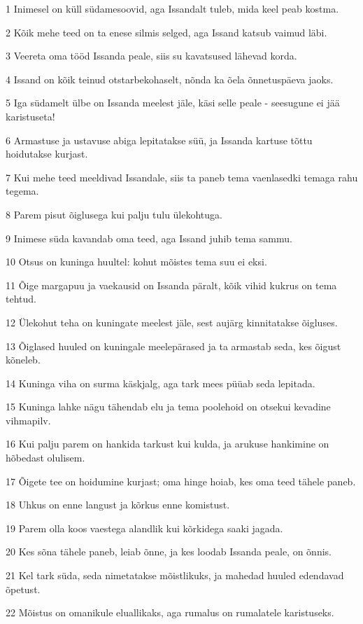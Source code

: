 \par 1 Inimesel on küll südamesoovid, aga Issandalt tuleb, mida keel peab kostma.
\par 2 Kõik mehe teed on ta enese silmis selged, aga Issand katsub vaimud läbi.
\par 3 Veereta oma tööd Issanda peale, siis su kavatsused lähevad korda.
\par 4 Issand on kõik teinud otstarbekohaselt, nõnda ka õela õnnetuspäeva jaoks.
\par 5 Iga südamelt ülbe on Issanda meelest jäle, käsi selle peale - seesugune ei jää karistuseta!
\par 6 Armastuse ja ustavuse abiga lepitatakse süü, ja Issanda kartuse tõttu hoidutakse kurjast.
\par 7 Kui mehe teed meeldivad Issandale, siis ta paneb tema vaenlasedki temaga rahu tegema.
\par 8 Parem pisut õiglusega kui palju tulu ülekohtuga.
\par 9 Inimese süda kavandab oma teed, aga Issand juhib tema sammu.
\par 10 Otsus on kuninga huultel: kohut mõistes tema suu ei eksi.
\par 11 Õige margapuu ja vaekausid on Issanda päralt, kõik vihid kukrus on tema tehtud.
\par 12 Ülekohut teha on kuningate meelest jäle, sest aujärg kinnitatakse õigluses.
\par 13 Õiglased huuled on kuningale meelepärased ja ta armastab seda, kes õigust kõneleb.
\par 14 Kuninga viha on surma käskjalg, aga tark mees püüab seda lepitada.
\par 15 Kuninga lahke nägu tähendab elu ja tema poolehoid on otsekui kevadine vihmapilv.
\par 16 Kui palju parem on hankida tarkust kui kulda, ja arukuse hankimine on hõbedast olulisem.
\par 17 Õigete tee on hoidumine kurjast; oma hinge hoiab, kes oma teed tähele paneb.
\par 18 Uhkus on enne langust ja kõrkus enne komistust.
\par 19 Parem olla koos vaestega alandlik kui kõrkidega saaki jagada.
\par 20 Kes sõna tähele paneb, leiab õnne, ja kes loodab Issanda peale, on õnnis.
\par 21 Kel tark süda, seda nimetatakse mõistlikuks, ja mahedad huuled edendavad õpetust.
\par 22 Mõistus on omanikule eluallikaks, aga rumalus on rumalatele karistuseks.
